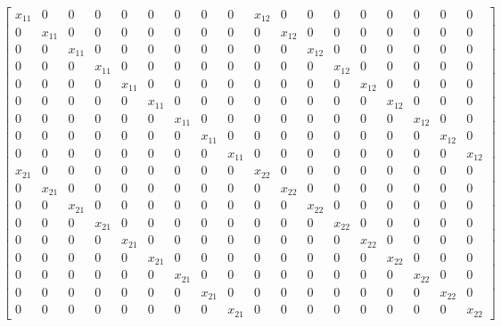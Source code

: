 \begin{equation*}
\left[\begin{array}{cccccccccccccccccc}x_{11} & 0 & 0 & 0 & 0 & 0 & 0 & 0 & 0 & x_{12} & 0 & 0 & 0 & 0 & 0 & 0 & 0 & 0\\0 & x_{11} & 0 & 0 & 0 & 0 & 0 & 0 & 0 & 0 & x_{12} & 0 & 0 & 0 & 0 & 0 & 0 & 0\\0 & 0 & x_{11} & 0 & 0 & 0 & 0 & 0 & 0 & 0 & 0 & x_{12} & 0 & 0 & 0 & 0 & 0 & 0\\0 & 0 & 0 & x_{11} & 0 & 0 & 0 & 0 & 0 & 0 & 0 & 0 & x_{12} & 0 & 0 & 0 & 0 & 0\\0 & 0 & 0 & 0 & x_{11} & 0 & 0 & 0 & 0 & 0 & 0 & 0 & 0 & x_{12} & 0 & 0 & 0 & 0\\0 & 0 & 0 & 0 & 0 & x_{11} & 0 & 0 & 0 & 0 & 0 & 0 & 0 & 0 & x_{12} & 0 & 0 & 0\\0 & 0 & 0 & 0 & 0 & 0 & x_{11} & 0 & 0 & 0 & 0 & 0 & 0 & 0 & 0 & x_{12} & 0 & 0\\0 & 0 & 0 & 0 & 0 & 0 & 0 & x_{11} & 0 & 0 & 0 & 0 & 0 & 0 & 0 & 0 & x_{12} & 0\\0 & 0 & 0 & 0 & 0 & 0 & 0 & 0 & x_{11} & 0 & 0 & 0 & 0 & 0 & 0 & 0 & 0 & x_{12}\\x_{21} & 0 & 0 & 0 & 0 & 0 & 0 & 0 & 0 & x_{22} & 0 & 0 & 0 & 0 & 0 & 0 & 0 & 0\\0 & x_{21} & 0 & 0 & 0 & 0 & 0 & 0 & 0 & 0 & x_{22} & 0 & 0 & 0 & 0 & 0 & 0 & 0\\0 & 0 & x_{21} & 0 & 0 & 0 & 0 & 0 & 0 & 0 & 0 & x_{22} & 0 & 0 & 0 & 0 & 0 & 0\\0 & 0 & 0 & x_{21} & 0 & 0 & 0 & 0 & 0 & 0 & 0 & 0 & x_{22} & 0 & 0 & 0 & 0 & 0\\0 & 0 & 0 & 0 & x_{21} & 0 & 0 & 0 & 0 & 0 & 0 & 0 & 0 & x_{22} & 0 & 0 & 0 & 0\\0 & 0 & 0 & 0 & 0 & x_{21} & 0 & 0 & 0 & 0 & 0 & 0 & 0 & 0 & x_{22} & 0 & 0 & 0\\0 & 0 & 0 & 0 & 0 & 0 & x_{21} & 0 & 0 & 0 & 0 & 0 & 0 & 0 & 0 & x_{22} & 0 & 0\\0 & 0 & 0 & 0 & 0 & 0 & 0 & x_{21} & 0 & 0 & 0 & 0 & 0 & 0 & 0 & 0 & x_{22} & 0\\0 & 0 & 0 & 0 & 0 & 0 & 0 & 0 & x_{21} & 0 & 0 & 0 & 0 & 0 & 0 & 0 & 0 & x_{22}\end{array}\right]
\end{equation*}

